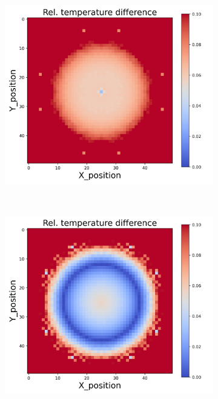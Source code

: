 \begin{figure}[h]
\begin{minipage}{\textwidth}
\begin{subfigure}{0.3\textwidth}
        \end{subfigure}
        \begin{subfigure}{0.3\textwidth}
            \centering
            \includegraphics[width=\textwidth]{figures/raw_data/21/exp/T_bias.jpg}
        \end{subfigure}
    \end{minipage}\\
    \begin{minipage}{\textwidth}
        \centering
        \begin{subfigure}{0.3\textwidth}
            \centering
            \includegraphics[width=\textwidth]{figures/raw_data/22/exp/T_bias.jpg}

\end{subfigure}
\end{minipage}
\end{figure}
